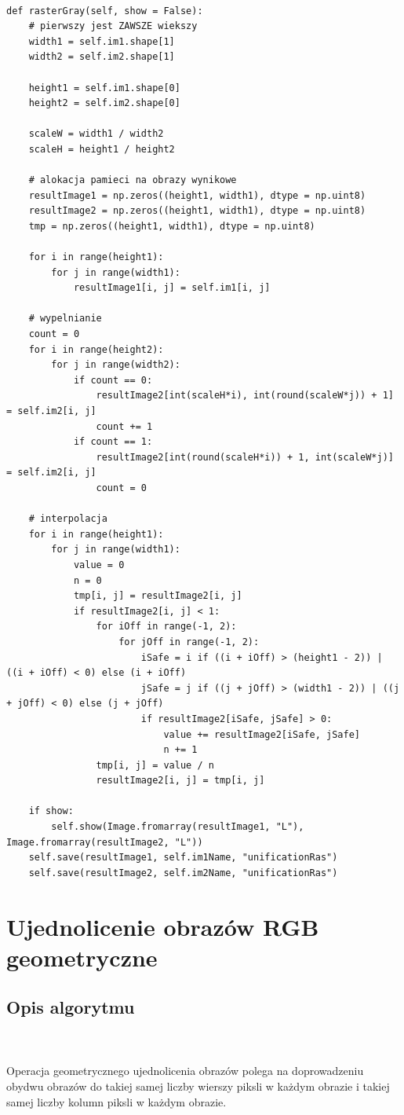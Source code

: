 \documentclass[final,a4paper,openany,12pt]{mwbk}
\begin{document}
\begin{lstlisting}[caption=Rastrowe ujednolicanie obrazów szarych]

def rasterGray(self, show = False):
	# pierwszy jest ZAWSZE wiekszy
	width1 = self.im1.shape[1]
	width2 = self.im2.shape[1]
	
	height1 = self.im1.shape[0]
	height2 = self.im2.shape[0]
	
	scaleW = width1 / width2
	scaleH = height1 / height2
	
	# alokacja pamieci na obrazy wynikowe
	resultImage1 = np.zeros((height1, width1), dtype = np.uint8)
	resultImage2 = np.zeros((height1, width1), dtype = np.uint8)
	tmp = np.zeros((height1, width1), dtype = np.uint8)
	
	for i in range(height1):
		for j in range(width1):
			resultImage1[i, j] = self.im1[i, j]
	
	# wypelnianie
	count = 0
	for i in range(height2):
		for j in range(width2):
			if count == 0:
				resultImage2[int(scaleH*i), int(round(scaleW*j)) + 1] = self.im2[i, j]
				count += 1
			if count == 1:
				resultImage2[int(round(scaleH*i)) + 1, int(scaleW*j)] = self.im2[i, j]
				count = 0
	
	# interpolacja
	for i in range(height1):
		for j in range(width1):
			value = 0
			n = 0
			tmp[i, j] = resultImage2[i, j]
			if resultImage2[i, j] < 1:
				for iOff in range(-1, 2):
					for jOff in range(-1, 2):
						iSafe = i if ((i + iOff) > (height1 - 2)) | ((i + iOff) < 0) else (i + iOff)
						jSafe = j if ((j + jOff) > (width1 - 2)) | ((j + jOff) < 0) else (j + jOff)
						if resultImage2[iSafe, jSafe] > 0:
							value += resultImage2[iSafe, jSafe]
							n += 1
				tmp[i, j] = value / n
				resultImage2[i, j] = tmp[i, j]
	
	if show:
		self.show(Image.fromarray(resultImage1, "L"), Image.fromarray(resultImage2, "L"))
	self.save(resultImage1, self.im1Name, "unificationRas")
	self.save(resultImage2, self.im2Name, "unificationRas")

\end{lstlisting}

\newpage







\section{Ujednolicenie obrazów RGB geometryczne}
\subsection*{Opis algorytmu}
\hfill
\\\\
\indent Operacja geometrycznego ujednolicenia obrazów polega na doprowadzeniu obydwu obrazów do takiej samej liczby wierszy piksli w każdym obrazie i takiej samej liczby kolumn piksli w każdym obrazie.
\end{document}
